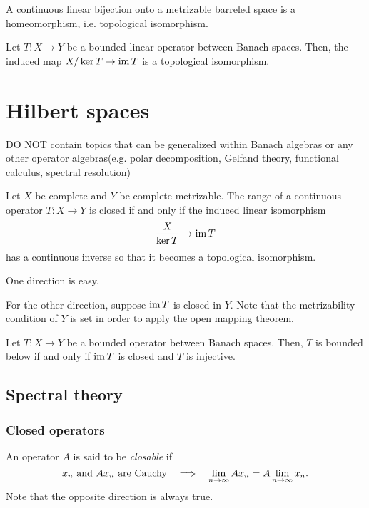\documentclass{../crs}
\begin{document}
\begin{cor}
A continuous linear bijection onto a metrizable barreled space is a homeomorphism, i.e. topological isomorphism.
\end{cor}
\begin{cor}
Let $T:X\to Y$ be a bounded linear operator between Banach spaces.
Then, the induced map $X/\ker T\to\im T$ is a topological isomorphism.
\end{cor}















\chapter{Hilbert spaces}
DO NOT contain topics that can be generalized within Banach algebras or any other operator algebras(e.g. polar decomposition, Gelfand theory, functional calculus, spectral resolution)

\begin{thm}
Let $X$ be complete and $Y$ be complete metrizable.
The range of a continuous operator $T:X\to Y$ is closed if and only if the induced linear isomorphism
\[\frac X{\ker T}\to\im T\]
has a continuous inverse so that it becomes a topological isomorphism.
\end{thm}
\begin{pf}
One direction is easy.

For the other direction, suppose $\operatorname{im} T$ is closed in $Y$.
Note that the metrizability condition of $Y$ is set in order to apply the open mapping theorem.
\end{pf}
\begin{cor}
Let $T:X\to Y$ be a bounded operator between Banach spaces.
Then, $T$ is bounded below if and only if $\operatorname{im} T$ is closed and $T$ is injective.
\end{cor}



\section{Spectral theory}


\subsection{Closed operators}
\begin{defn}
An operator $A$ is said to be \emph{closable} if
\[x_n\text{ and }Ax_n\text{ are Cauchy}\impl\lim_{n\to\infty}Ax_n=A\lim_{n\to\infty}x_n.\]
Note that the opposite direction is always true.
\end{defn}
\end{document}
